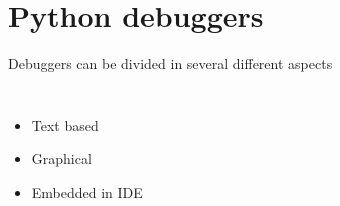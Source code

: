 \documentclass[14pt,notes,svgnames,aspectratio=169]{beamer}
\begin{document}
\begin{frame}
\begin{columns}
{        }
    \end{columns}
\end{frame}

\begingroup
    \section{Python debuggers}
\endgroup

\begin{frame}
    Debuggers can be divided in several different aspects

    \begin{columns}
        \begin{itemize}[<+->]
            \item<1,2,3> Text based
            \item<2,3> Graphical
            \item<3> Embedded in IDE
        \end{itemize}
    \end{columns}
\end{frame}
\end{document}
